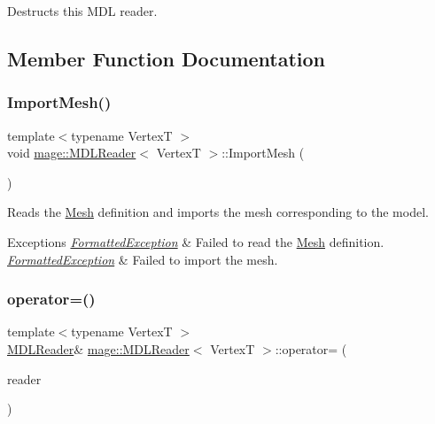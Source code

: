 Destructs this M\+DL reader. 

\subsection{Member Function Documentation}
\hypertarget{classmage_1_1_m_d_l_reader_ab688ce530cab867d155b696b2a1133a0}{}\label{classmage_1_1_m_d_l_reader_ab688ce530cab867d155b696b2a1133a0} 
\subsubsection{\texorpdfstring{Import\+Mesh()}{ImportMesh()}}
{\footnotesize\ttfamily template$<$typename VertexT $>$ \\
void \hyperlink{classmage_1_1_m_d_l_reader}{mage\+::\+M\+D\+L\+Reader}$<$ VertexT $>$\+::Import\+Mesh (\begin{DoxyParamCaption}{ }\end{DoxyParamCaption})\hspace{0.3cm}{\ttfamily [private]}}

Reads the \hyperlink{classmage_1_1_mesh}{Mesh} definition and imports the mesh corresponding to the model.


\begin{DoxyExceptions}{Exceptions}
{\em \hyperlink{structmage_1_1_formatted_exception}{Formatted\+Exception}} & Failed to read the \hyperlink{classmage_1_1_mesh}{Mesh} definition. \\
\hline
{\em \hyperlink{structmage_1_1_formatted_exception}{Formatted\+Exception}} & Failed to import the mesh. \\
\hline
\end{DoxyExceptions}
\hypertarget{classmage_1_1_m_d_l_reader_a8cc5e9966283f3f9727fa28a75412ddb}{}\label{classmage_1_1_m_d_l_reader_a8cc5e9966283f3f9727fa28a75412ddb} 
\subsubsection{\texorpdfstring{operator=()}{operator=()}\hspace{0.1cm}{\footnotesize\ttfamily [1/2]}}
{\footnotesize\ttfamily template$<$typename VertexT $>$ \\
\hyperlink{classmage_1_1_m_d_l_reader}{M\+D\+L\+Reader}\& \hyperlink{classmage_1_1_m_d_l_reader}{mage\+::\+M\+D\+L\+Reader}$<$ VertexT $>$\+::operator= (\begin{DoxyParamCaption}\item[{const \hyperlink{classmage_1_1_m_d_l_reader}{M\+D\+L\+Reader}$<$ VertexT $>$ \&}]{reader }\end{DoxyParamCaption})\hspace{0.3cm}{\ttfamily [delete]}}

